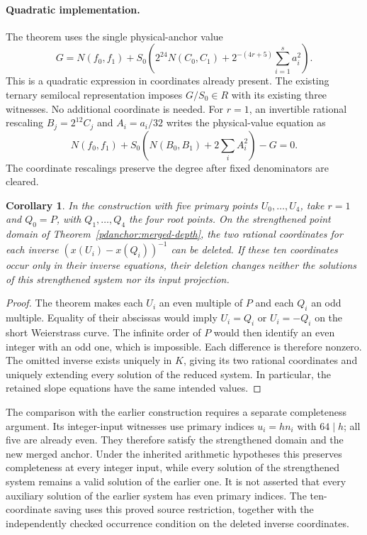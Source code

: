 \documentclass[11pt,a4paper]{article}
\newtheorem{corollary}[theorem]{Corollary}
\theoremstyle{definition}
\theoremstyle{remark}
\begin{document}
\paragraph{Quadratic implementation.}
The theorem uses the single physical-anchor value
\[
 G=N(f_0,f_1)+S_0\left(2^{24}N(C_0,C_1)
                     +2^{-(4r+5)}\sum_{i=1}^{s}a_i^2\right).
\]
This is a quadratic expression in coordinates already present.
The existing ternary semilocal representation imposes
$G/S_0\in R$ with its existing three witnesses.  No additional
coordinate is needed.  For $r=1$, an invertible rational
rescaling $B_j=2^{12}C_j$ and $A_i=a_i/32$ writes the
physical-value equation as
\[
 N(f_0,f_1)+S_0\left(N(B_0,B_1)+2\sum_iA_i^2\right)-G=0.
\]
The coordinate rescalings preserve the degree after fixed
denominators are cleared.

\begin{corollary}\label{pdanchor:five-inverse-pairs}
In the construction with five primary points $U_0,\ldots,U_4$,
take $r=1$ and $Q_0=P$, with $Q_1,\ldots,Q_4$ the four root
points.  On the strengthened point domain of
Theorem~\ref{pdanchor:merged-depth}, the two rational coordinates
for each inverse $(x(U_i)-x(Q_i))^{-1}$ can be deleted.
If these ten coordinates occur only in their inverse equations,
their deletion changes neither the solutions of this strengthened
system nor its input projection.
\end{corollary}
\begin{proof}
The theorem makes each $U_i$ an even multiple of $P$ and
each $Q_i$ an odd multiple.  Equality of their abscissas would
imply $U_i=Q_i$ or $U_i=-Q_i$ on the short Weierstrass curve.
The infinite order of $P$ would then identify an even integer
with an odd one, which is impossible.  Each difference is
therefore nonzero.  The omitted inverse exists uniquely in
$K$, giving its two rational coordinates and uniquely extending
every solution of the reduced system.  In particular, the
retained slope equations have the same intended values.
\end{proof}

The comparison with the earlier construction requires a separate
completeness argument.  Its integer-input witnesses use primary
indices $u_i=hn_i$ with $64\mid h$; all five are already even.
They therefore satisfy the strengthened domain and the new merged
anchor.  Under the inherited arithmetic hypotheses this preserves
completeness at every integer input, while every solution of the
strengthened system remains a valid solution of the earlier one.
It is not asserted that every auxiliary solution of the earlier
system has even primary indices.  The ten-coordinate saving uses
this proved source restriction, together with the independently
checked occurrence condition on the deleted inverse coordinates.
\end{document}

